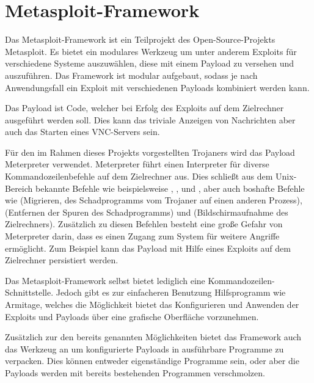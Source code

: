 \section{Metasploit-Framework \cite{MSPLH}}\label{sec:metasploit}
Das Metasploit-Framework ist ein Teilprojekt des Open-Source-Projekts Metasploit.
Es bietet ein modulares Werkzeug um unter anderem Exploits für verschiedene Systeme auszuwählen,
diese mit einem Payload zu versehen und auszuführen. Das Framework ist modular aufgebaut, sodass je nach Anwendungsfall ein Exploit mit verschiedenen Payloads kombiniert werden kann.

Das Payload ist Code, welcher bei Erfolg des Exploits auf dem Zielrechner ausgeführt werden soll.
Dies kann das triviale Anzeigen von Nachrichten aber auch das Starten eines VNC-Servers sein.

Für den im Rahmen dieses Projekts vorgestellten Trojaners wird das Payload Meterpreter \cite{OSMTP} verwendet.
Meterpreter führt einen Interpreter für diverse Kommandozeilenbefehle auf dem Zielrechner aus.
Dies schließt aus dem Unix-Bereich bekannte Befehle wie beispielsweise , ,  und ,
aber auch boshafte Befehle wie  (Migrieren, des Schadprogramms vom Trojaner auf einen anderen Prozess),
 (Entfernen der Spuren des Schadprogramms) und  (Bildschirmaufnahme des Zielrechners).
Zusätzlich zu diesen Befehlen besteht eine große Gefahr von Meterpreter darin, dass es einen Zugang zum System für weitere Angriffe ermöglicht.
Zum Beispiel kann das Payload mit Hilfe eines Exploits auf dem Zielrechner persistiert werden.

Das Metasploit-Framework selbst bietet lediglich eine Kommandozeilen-Schnittstelle.
Jedoch gibt es zur einfacheren Benutzung Hilfsprogramm wie Armitage,
welches die Möglichkeit bietet das Konfigurieren und Anwenden der Exploits und Payloads über eine grafische Oberfläche vorzunehmen.

Zusätzlich zur den bereits genannten Möglichkeiten bietet das Framework auch das Werkzeug  an um konfigurierte Payloads in ausführbare Programme zu verpacken.
Dies können entweder eigenständige Programme sein, oder aber die Payloads werden mit bereits bestehenden Programmen verschmolzen. 